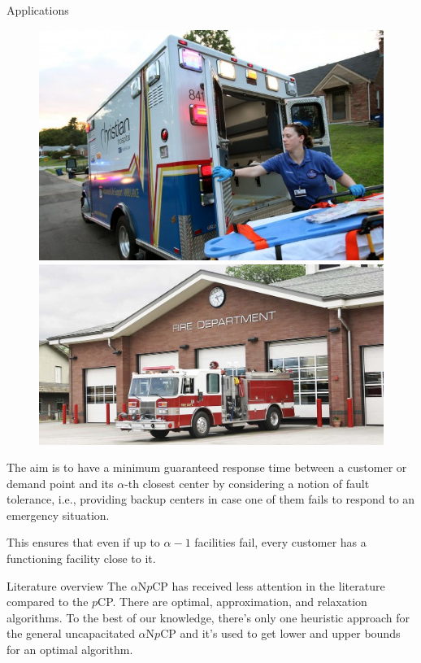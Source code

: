 \documentclass{beamer}
\newcommand{\anpcp}{$\alpha$N$p$CP\xspace}
\newcommand{\pcp}{$p$CP\xspace}
\begin{document}
\begin{frame}{Applications}
    \begin{figure}
        \centering
        \includegraphics[scale=0.19]{ambulance}
        \includegraphics[scale=0.14]{fire_station}
    \end{figure}
    The aim is to have a minimum guaranteed response time between a customer or demand point and its $\alpha$-th closest center by considering a notion of fault tolerance, i.e., providing backup centers in case one of them fails to respond to an emergency situation.
    
    This ensures that even if up to $\alpha - 1$ facilities fail, every customer has a functioning facility close to it.
\end{frame}

\begin{frame}{Literature overview}
    The \anpcp has received less attention in the literature compared to the \pcp. There are optimal, approximation, and relaxation algorithms.
    To the best of our knowledge, there's only one heuristic approach for the general uncapacitated \anpcp and it's used to get lower and upper bounds for an optimal algorithm.
\end{frame}
\end{document}
